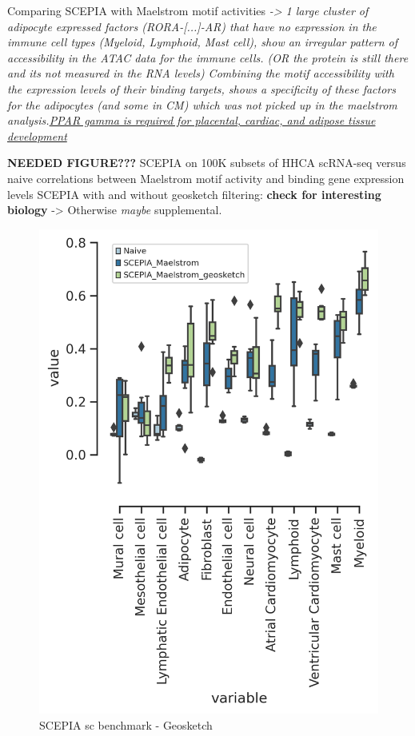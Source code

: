 Comparing SCEPIA with Maelstrom motif activities
\textit{-> 1 large cluster of adipocyte expressed factors (RORA-[...]-AR) that have no expression in the immune cell types (Myeloid, Lymphoid, Mast cell), show an irregular pattern of accessibility in the ATAC data for the immune cells. (OR the protein is still there and its not measured in the RNA levels) Combining the motif accessibility with the expression levels of their binding targets, shows a specificity of these factors for the adipocytes (and some in CM) which was not picked up in the maelstrom analysis.\href{https://www.cell.com/molecular-cell/fulltext/S1097-2765(00)80209-9?_returnURL=https\%3A\%2F\%2Flinkinghub.elsevier.com\%2Fretrieve\%2Fpii\%2FS1097276500802099\%3Fshowall\%3Dtrue}{PPAR gamma is required for placental, cardiac, and adipose tissue development }}

\textbf{NEEDED FIGURE???}
SCEPIA on 100K subsets of HHCA scRNA-seq versus naive correlations between Maelstrom motif activity and binding gene expression levels
SCEPIA with and without geosketch filtering: \textbf{check for interesting biology} -> Otherwise \textit{maybe} supplemental.
\begin{figure}
    \centering
    \includegraphics[width=0.75\linewidth]{ch.scepia/imgs/CorrelationsGeosketch_perCT.png}
    \caption{SCEPIA sc benchmark - Geosketch}
    \label{fig:sc_benchmark}
\end{figure}

